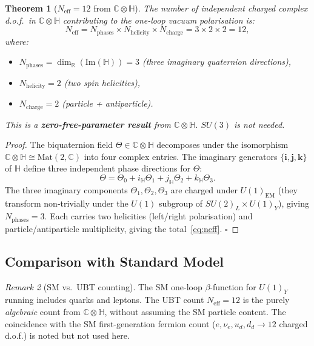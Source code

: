 \documentclass[12pt,a4paper]{article}
\newtheorem{theorem}{Theorem}[section]
\theoremstyle{definition}
\theoremstyle{remark}
\newtheorem{remark}[theorem]{Remark}
\newcommand{\C}{\mathbb{C}}
\newcommand{\R}{\mathbb{R}}
\renewcommand{\H}{\mathbb{H}}
\newcommand{\im}{\mathrm{Im}}
\begin{document}
\begin{theorem}[$N_{\mathrm{eff}} = 12$ from $\C\otimes\H$]
\label{thm:neff}
The number of independent charged complex d.o.f.\ in $\C\otimes\H$
contributing to the one-loop vacuum polarisation is:
\begin{equation}
  \boxed{N_{\mathrm{eff}} = N_{\mathrm{phases}} \times N_{\mathrm{helicity}}
                \times N_{\mathrm{charge}} = 3 \times 2 \times 2 = 12,}
\label{eq:neff}
\end{equation}
where:
\begin{itemize}
  \item $N_{\mathrm{phases}} = \dim_{\R}(\im(\H)) = 3$
    (three imaginary quaternion directions),
  \item $N_{\mathrm{helicity}} = 2$ (two spin helicities),
  \item $N_{\mathrm{charge}} = 2$ (particle + antiparticle).
\end{itemize}
This is a \textbf{zero-free-parameter result} from $\C\otimes\H$.
$SU(3)$ is not needed.
\end{theorem}

\begin{proof}
The biquaternion field $\Theta\in\C\otimes\H$ decomposes under the
isomorphism $\C\otimes\H\cong\mathrm{Mat}(2,\C)$ into four complex
entries.  The imaginary generators $\{\mathbf{i},\mathbf{j},\mathbf{k}\}$
of $\H$ define three independent phase directions for $\Theta$:
\[
  \Theta = \Theta_0 + i_\H\Theta_1 + j_\H\Theta_2 + k_\H\Theta_3.
\]
The three imaginary components $\Theta_1, \Theta_2, \Theta_3$ are
charged under $U(1)_{\mathrm{EM}}$ (they transform non-trivially under
the $U(1)$ subgroup of $SU(2)_L\times U(1)_Y$), giving
$N_{\mathrm{phases}} = 3$.
Each carries two helicities (left/right polarisation) and
particle/antiparticle multiplicity, giving the total~\eqref{eq:neff}. $\square$
\end{proof}

\subsection{Comparison with Standard Model}

\begin{remark}[SM vs.\ UBT counting]
The SM one-loop $\beta$-function for $U(1)_Y$ running includes
quarks and leptons.  The UBT count $N_{\mathrm{eff}} = 12$ is the
purely \emph{algebraic} count from $\C\otimes\H$, without assuming the
SM particle content.  The coincidence with the SM first-generation
fermion count ($e, \nu_e, u_d, d_d \to 12$ charged d.o.f.) is
noted but not used here.
\end{remark}
\end{document}
